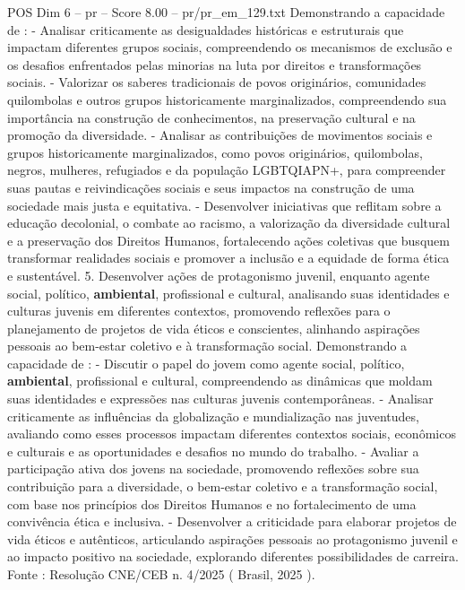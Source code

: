 \begin{textsample}{POS Dim 6 – pr – Score 8.00 – pr/pr\_em\_129.txt}
Demonstrando a capacidade de : - Analisar criticamente as desigualdades históricas e estruturais que impactam diferentes grupos sociais, compreendendo os mecanismos de exclusão e os desafios enfrentados pelas minorias na luta por direitos e transformações sociais. - Valorizar os saberes tradicionais de povos originários, comunidades quilombolas e outros grupos historicamente marginalizados, compreendendo sua importância na construção de conhecimentos, na preservação cultural e na promoção da diversidade. - Analisar as contribuições de movimentos sociais e grupos historicamente marginalizados, como povos originários, quilombolas, negros, mulheres, refugiados e da população LGBTQIAPN+, para compreender suas pautas e reivindicações sociais e seus impactos na construção de uma sociedade mais justa e equitativa. - Desenvolver iniciativas que reflitam sobre a educação decolonial, o combate ao racismo, a valorização da diversidade cultural e a preservação dos Direitos Humanos, fortalecendo ações coletivas que busquem transformar realidades sociais e promover a inclusão e a equidade de forma ética e sustentável. 5.
Desenvolver ações de protagonismo juvenil, enquanto agente social, político, \textbf{ambiental}, profissional e cultural, analisando suas identidades e culturas juvenis em diferentes contextos, promovendo reflexões para o planejamento de projetos de vida éticos e conscientes, alinhando aspirações pessoais ao bem-estar coletivo e à transformação social.
Demonstrando a capacidade de : - Discutir o papel do jovem como agente social, político, \textbf{ambiental}, profissional e cultural, compreendendo as dinâmicas que moldam suas identidades e expressões nas culturas juvenis contemporâneas. - Analisar criticamente as influências da globalização e mundialização nas juventudes, avaliando como esses processos impactam diferentes contextos sociais, econômicos e culturais e as oportunidades e desafios no mundo do trabalho. - Avaliar a participação ativa dos jovens na sociedade, promovendo reflexões sobre sua contribuição para a diversidade, o bem-estar coletivo e a transformação social, com base nos princípios dos Direitos Humanos e no fortalecimento de uma convivência ética e inclusiva. - Desenvolver a criticidade para elaborar projetos de vida éticos e autênticos, articulando aspirações pessoais ao protagonismo juvenil e ao impacto positivo na sociedade, explorando diferentes possibilidades de carreira.
Fonte : Resolução CNE/CEB n. 4/2025 ( Brasil, 2025 ).

\end{textsample}

